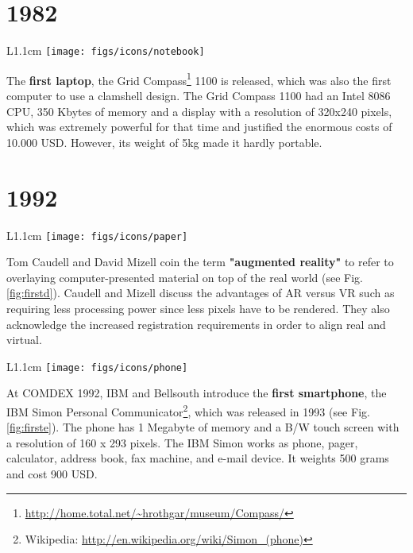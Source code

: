 \documentclass[12pt,a4paper]{article}
\begin{document}
\section*{1982}
\begin{wrapfigure}{L}{1.1cm}
	\vspace{-10pt}	
	\texttt{[image: figs/icons/notebook]}
	\vspace{-10pt}		
\end{wrapfigure}
The \textbf{first laptop}, the Grid Compass\footnote{\url{http://home.total.net/~hrothgar/museum/Compass/}} 
1100 is released, which was also the first computer to use a clamshell design. The Grid Compass 1100 had an Intel 8086 CPU, 350 Kbytes of memory and a display with a resolution of 320x240 pixels, which was extremely powerful for that time and justified the enormous costs of 10.000 USD. However, its weight of 5kg made it hardly portable.

\vspace{-5pt}
\section*{1992}
\begin{wrapfigure}{L}{1.1cm}
	\vspace{-10pt}	
	\texttt{[image: figs/icons/paper]}
	\vspace{-10pt}		
\end{wrapfigure}
Tom Caudell and David Mizell coin the term \textbf{"augmented reality"} to refer to overlaying computer-presented material on top of the real world \cite{Caudell92} (see Fig.\ref{fig:firstd}). Caudell and Mizell discuss the advantages of AR versus VR such as requiring less processing power since less pixels have to be rendered. They also acknowledge the increased registration requirements in order to align real and virtual.

\vspace{0.1in}

\begin{wrapfigure}{L}{1.1cm}
	\vspace{-10pt}	
	\texttt{[image: figs/icons/phone]}
	\vspace{-10pt}		
\end{wrapfigure}
\noindent At COMDEX 1992, IBM and Bellsouth introduce the \textbf{first smartphone}, the IBM Simon Personal Communicator\footnote{Wikipedia: \url{http://en.wikipedia.org/wiki/Simon_(phone)}}, which was released in 1993 (see Fig.\ref{fig:firste}). The phone has 1 Megabyte of memory and a B/W touch screen with a resolution of 160 x 293 pixels. The IBM Simon works as phone, pager, calculator, address book, fax machine, and e-mail device. It weights 500 grams and cost 900 USD.
\end{document}
